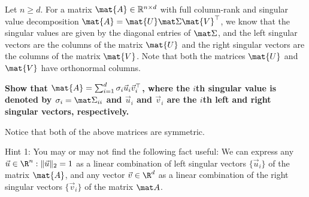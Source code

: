 \documentclass[preview]{standalone}
\begin{document}
\begin{Parts}
\Part Let $n \geq d$. For a matrix $\mat{A} \in \mathbb{R}^{n \times d}$ with full
column-rank and singular value decomposition $\mat{A} = \mat{U} \mat \Sigma \mat{V}^\top$,
we know that the singular values are given by the diagonal entries of $\mat \Sigma$,
and the left singular vectors are the columns of the matrix $\mat{U}$ and
the right singular vectors are the columns of the matrix $\mat{V}$.
Note that both the matrices $\mat{U}$ and $\mat{V}$ have orthonormal columns.

{\bf Show that $\mat{A} = \sum_{i=1}^d \sigma_i \vec{u}_i \vec{v}_i^\top$, where the $i$th
singular value is denoted by $\sigma_i = \mat \Sigma_{ii}$ and $\vec{u}_i$ and
$\vec{v}_i$ are the $i$th left and right singular vectors, respectively.}




Notice that both of the above matrices are symmetric.





Hint 1: You may or may not find the following fact useful:
We can express any $\vec{u} \in \R^n: \|\vec{u} \|_2 = 1$ as a linear combination
of left singular vectors $\{ \vec u_i \}$ of the matrix $\mat{A}$, and any vector $\vec{v} \in \R^d$
as a linear combination of the right singular vectors $\{ \vec v_i \}$ of the matrix $\mat A$.


\end{Parts}
\end{document}
